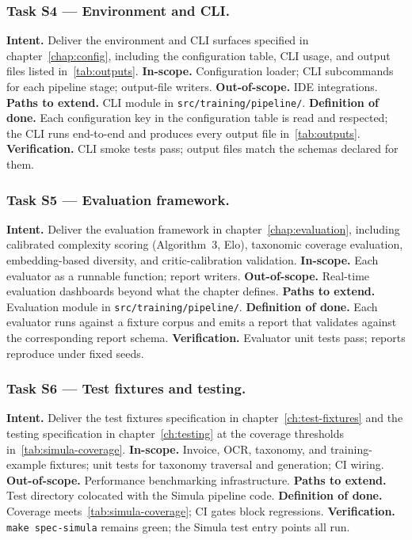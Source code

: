 \subsubsection{Task S4 --- Environment and CLI.}
\textbf{Intent.} Deliver the environment and CLI surfaces specified
in chapter~\ref{chap:config}, including the configuration table, CLI
usage, and output files listed in~\ref{tab:outputs}.
\textbf{In-scope.} Configuration loader; CLI subcommands for each
pipeline stage; output-file writers.
\textbf{Out-of-scope.} IDE integrations.
\textbf{Paths to extend.} CLI module in
\texttt{src/training/pipeline/}.
\textbf{Definition of done.} Each configuration key in the
configuration table is read and respected; the CLI runs end-to-end
and produces every output file in~\ref{tab:outputs}.
\textbf{Verification.} CLI smoke tests pass; output files match the
schemas declared for them.

\subsubsection{Task S5 --- Evaluation framework.}
\textbf{Intent.} Deliver the evaluation framework in
chapter~\ref{chap:evaluation}, including calibrated complexity
scoring (Algorithm~3, Elo), taxonomic coverage evaluation,
embedding-based diversity, and critic-calibration validation.
\textbf{In-scope.} Each evaluator as a runnable function; report
writers.
\textbf{Out-of-scope.} Real-time evaluation dashboards beyond what
the chapter defines.
\textbf{Paths to extend.} Evaluation module in
\texttt{src/training/pipeline/}.
\textbf{Definition of done.} Each evaluator runs against a fixture
corpus and emits a report that validates against the corresponding
report schema.
\textbf{Verification.} Evaluator unit tests pass; reports reproduce
under fixed seeds.

\subsubsection{Task S6 --- Test fixtures and testing.}
\textbf{Intent.} Deliver the test fixtures specification in
chapter~\ref{ch:test-fixtures} and the testing specification in
chapter~\ref{ch:testing} at the coverage thresholds
in~\ref{tab:simula-coverage}.
\textbf{In-scope.} Invoice, OCR, taxonomy, and training-example
fixtures; unit tests for taxonomy traversal and generation; CI
wiring.
\textbf{Out-of-scope.} Performance benchmarking infrastructure.
\textbf{Paths to extend.} Test directory colocated with the Simula
pipeline code.
\textbf{Definition of done.} Coverage meets~\ref{tab:simula-coverage};
CI gates block regressions.
\textbf{Verification.} \texttt{make spec-simula} remains green; the
Simula test entry points all run.


